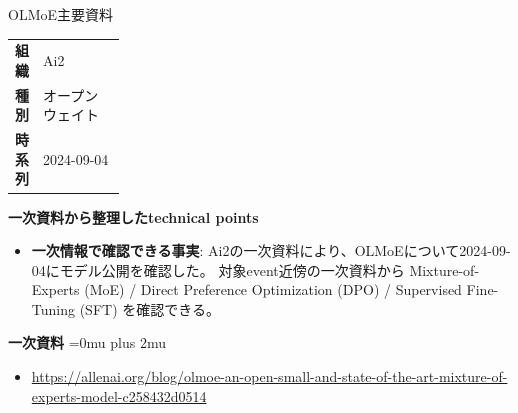 \begin{technicalnote}{OLMoE}{主要資料}
\begingroup
\begin{tabularx}{\linewidth}{@{}>{\bfseries}p{0.22\linewidth}X@{}}
組織 & Ai2 \\
種別 & オープンウェイト \\
時系列 & 2024-09-04 \\
\end{tabularx}
\smallskip
{\bfseries 一次資料から整理したtechnical points}
\begin{itemize}[leftmargin=1.5em,itemsep=0.35em]
\item \textbf{一次情報で確認できる事実}: Ai2の一次資料により、OLMoEについて2024-09-04にモデル公開を確認した。 対象event近傍の一次資料から Mixture-of-Experts (MoE) / Direct Preference Optimization (DPO) / Supervised Fine-Tuning (SFT) を確認できる。
\end{itemize}
\begin{minipage}{\linewidth}
\begin{samepage}
{\bfseries 一次資料}
\begingroup\sloppy
\Urlmuskip=0mu plus 2mu\relax
\begin{itemize}[leftmargin=1.5em,itemsep=0.25em]
\item {\scriptsize\url{https://allenai.org/blog/olmoe-an-open-small-and-state-of-the-art-mixture-of-experts-model-c258432d0514}}
\end{itemize}
\endgroup
\end{samepage}
\end{minipage}
\endgroup
\end{technicalnote}
\medskip

